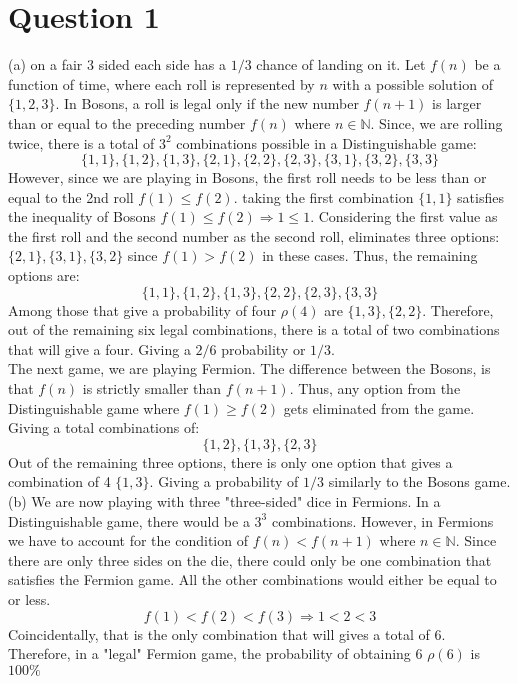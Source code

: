 \documentclass[11pt]{article}
\def\mbb{\mathbb}
\def\N{\mbb{N}}
\theoremstyle{pink}
\theoremstyle{boxedsolution}
\theoremstyle{definition}
\theoremstyle{claim}
\begin{document}
 \section*{Question 1}
(a) on a fair 3 sided each side has a $1/3$ chance of landing on it. Let $f(n)$ be a function of time, where each roll is represented by $n$ with a possible solution of $\{1,2,3\}$. In Bosons, a roll is legal only if the new number $f(n+1)$ is larger than or equal to the preceding number $f(n)$ where $n\in\N$. Since, we are rolling twice, there is a total of $3^2$ combinations possible in a Distinguishable game:
\[\{1,1\},\{1,2\},\{1,3\},\{2,1\},\{2,2\},\{2,3\},\{3,1\},\{3,2\},\{3,3\}\]
However, since we are playing in Bosons, the first roll needs to be less than or equal to the 2nd roll $f(1)\leq f(2)$. taking the first combination $\{1,1\}$ satisfies the inequality of Bosons $f(1)\leq f(2) \Rightarrow 1\leq 1$. Considering the first value as the first roll and the second number as the second roll, eliminates three options: $\{2,1\},\{3,1\},\{3,2\}$ since $f(1)>f(2)$ in these cases. Thus, the remaining options are:
\[\{1,1\},\{1,2\},\{1,3\},\{2,2\},\{2,3\},\{3,3\}\]
Among those that give a probability of four $\rho(4)$ are $\{1,3\},\{2,2\}$. Therefore, out of the remaining six legal combinations, there is a total of two combinations that will give a four. Giving a $2/6$ probability or $1/3$.
\vspace{3mm}
\\The next game, we are playing Fermion. The difference between the Bosons, is that $f(n)$ is strictly smaller than $f(n+1)$. Thus, any option from the Distinguishable game where $f(1)\geq f(2)$ gets eliminated from the game. Giving a total combinations of:
\[\{1,2\},\{1,3\},\{2,3\}\]
Out of the remaining three options, there is only one option that gives a combination of 4 $\{1,3\}$. Giving a probability of $1/3$ similarly to the Bosons game.
\vspace{5mm}
\\(b) We are now playing with three "three-sided" dice in Fermions. In a Distinguishable game, there would be a $3^3$ combinations. However, in Fermions we have to account for the condition of $f(n)<f(n+1)$ where $n\in\N$. Since there are only three sides on the die, there could only be one combination that satisfies the Fermion game. All the other combinations would either be equal to or less. \[f(1)<f(2)<f(3) \Rightarrow 1<2<3\]
Coincidentally, that is the only combination that will gives a total of 6. Therefore, in a "legal" Fermion game, the probability of obtaining 6 $\rho(6)$ is $100\%$
\end{document}
